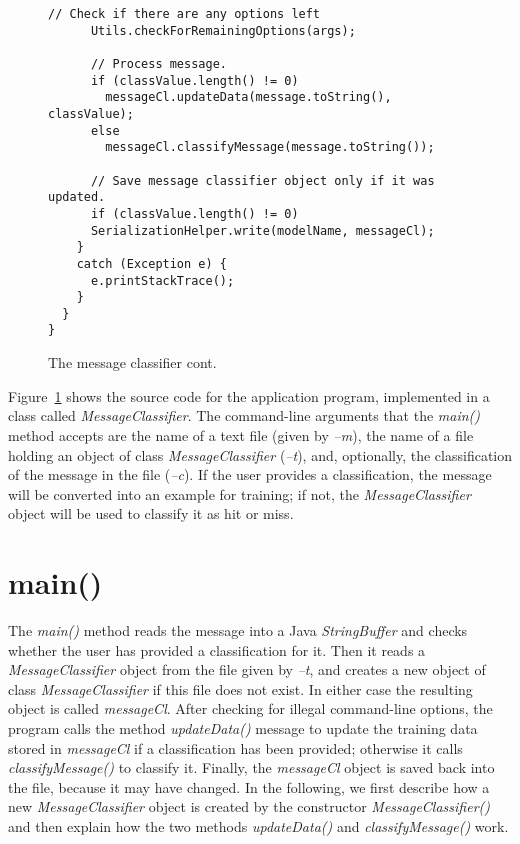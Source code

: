 \begin{figure}[!thp]
\begin{mdframed}[innermargin=-1cm]
\begin{Verbatim}[fontsize=\scriptsize]
      // Check if there are any options left
      Utils.checkForRemainingOptions(args);

      // Process message.
      if (classValue.length() != 0)
        messageCl.updateData(message.toString(), classValue);
      else
        messageCl.classifyMessage(message.toString());

      // Save message classifier object only if it was updated.
      if (classValue.length() != 0)
      SerializationHelper.write(modelName, messageCl);
    }
    catch (Exception e) {
      e.printStackTrace();
    }
  }
}
\end{Verbatim}
\end{mdframed}
\caption{\label{fig:message_classifier}The message classifier cont.}
\end{figure}

Figure~\ref{fig:message_classifier} shows the source code for the
application program, implemented in a class called
\textit{MessageClassifier}. The command-line arguments that the
\textit{main()} method accepts are the name of a text file (given by
\textit{--m}), the name of a file holding an object of class
\textit{MessageClassifier} (\textit{--t}), and, optionally, the
classification of the message in the file (\textit{--c}). If the user
provides a classification, the message will be converted into an
example for training; if not, the \textit{MessageClassifier} object
will be used to classify it as hit or miss.

\section{main()}

The \textit{main()} method reads the message into a Java
\textit{StringBuffer} and checks whether the user has provided a
classification for it. Then it reads a \textit{MessageClassifier}
object from the file given by \textit{--t}, and creates a new object
of class \textit{MessageClassifier} if this file does not exist. In
either case the resulting object is called \textit{messageCl}. After
checking for illegal command-line options, the program calls the
method \textit{updateData()} message to update the training data
stored in \textit{messageCl} if a classification has been provided;
otherwise it calls \textit{classifyMessage()} to classify it. Finally,
the \textit{messageCl} object is saved back into the file, because it
may have changed. In the following, we first describe how a new
\textit{MessageClassifier} object is created by the constructor
\textit{MessageClassifier()} and then explain how the two methods
\textit{updateData()} and \textit{classifyMessage()} work.

